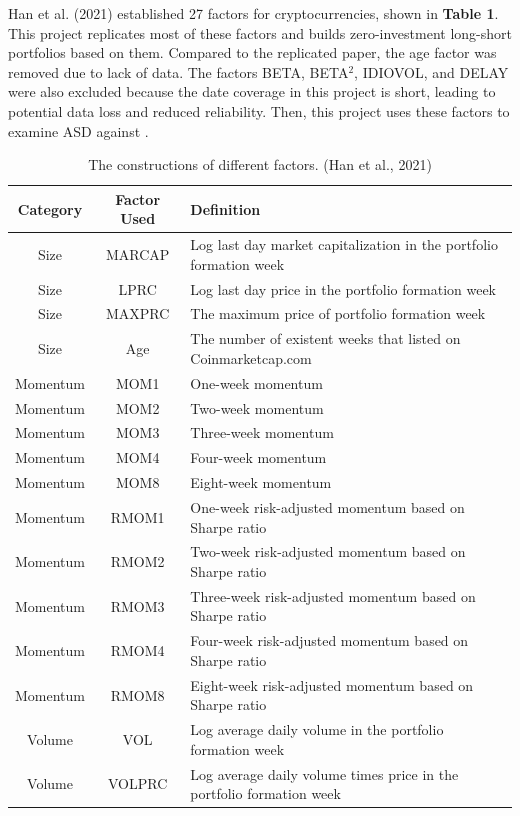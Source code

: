 \documentclass{article}
\begin{document}
Han et al. (2021) established 27 factors for cryptocurrencies, shown in {\bf Table 1}. This project replicates most of these factors and builds zero-investment long-short portfolios based on them. Compared to the replicated paper, the age factor was removed due to lack of data. The factors BETA, BETA$^2$, IDIOVOL, and DELAY were also excluded because the date coverage in this project is short, leading to potential data loss and reduced reliability. Then, this project uses these factors to examine ASD against .


\begin{table}[h]
    \centering
    \caption{The constructions of different factors. (Han et al., 2021)}
    \begin{tabular}{|c|c|p{10cm}|}
        \hline
        \textbf{Category} & \textbf{Factor Used} & \textbf{Definition} \\
        \hline
        Size & MARCAP & Log last day market capitalization in the portfolio formation week \\
        Size & LPRC & Log last day price in the portfolio formation week \\
        Size & MAXPRC & The maximum price of portfolio formation week \\
        Size & Age & The number of existent weeks that listed on Coinmarketcap.com \\
        Momentum & MOM1 & One-week momentum \\
        Momentum & MOM2 & Two-week momentum \\
        Momentum & MOM3 & Three-week momentum \\
        Momentum & MOM4 & Four-week momentum \\
        Momentum & MOM8 & Eight-week momentum \\
        Momentum & RMOM1 & One-week risk-adjusted momentum based on Sharpe ratio \\
        Momentum & RMOM2 & Two-week risk-adjusted momentum based on Sharpe ratio \\
        Momentum & RMOM3 & Three-week risk-adjusted momentum based on Sharpe ratio \\
        Momentum & RMOM4 & Four-week risk-adjusted momentum based on Sharpe ratio \\
        Momentum & RMOM8 & Eight-week risk-adjusted momentum based on Sharpe ratio \\
        Volume & VOL & Log average daily volume in the portfolio formation week \\
        Volume & VOLPRC & Log average daily volume times price in the portfolio formation week \\

\end{tabular}
\end{table}
\end{document}
